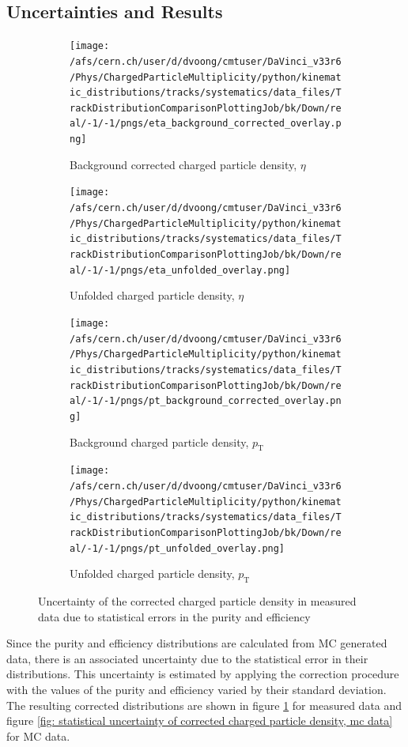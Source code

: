 \subsection{Uncertainties and Results}
\label{subsection: charged particle density, systematics}

\begin{figure}[h]
	\begin{subfigure}{0.49\textwidth}
		\texttt{[image: /afs/cern.ch/user/d/dvoong/cmtuser/DaVinci\_v33r6/Phys/ChargedParticleMultiplicity/python/kinematic\_distributions/tracks/systematics/data\_files/TrackDistributionComparisonPlottingJob/bk/Down/real/-1/-1/pngs/eta\_background\_corrected\_overlay.png]}
		\caption{Background corrected charged particle density, $\eta$}
	\end{subfigure}
	\begin{subfigure}{0.49\textwidth}
		\texttt{[image: /afs/cern.ch/user/d/dvoong/cmtuser/DaVinci\_v33r6/Phys/ChargedParticleMultiplicity/python/kinematic\_distributions/tracks/systematics/data\_files/TrackDistributionComparisonPlottingJob/bk/Down/real/-1/-1/pngs/eta\_unfolded\_overlay.png]}
		\caption{Unfolded charged particle density, $\eta$}
	\end{subfigure}
	\begin{subfigure}{0.49\textwidth}
		\texttt{[image: /afs/cern.ch/user/d/dvoong/cmtuser/DaVinci\_v33r6/Phys/ChargedParticleMultiplicity/python/kinematic\_distributions/tracks/systematics/data\_files/TrackDistributionComparisonPlottingJob/bk/Down/real/-1/-1/pngs/pt\_background\_corrected\_overlay.png]}
		\caption{Background  charged particle density, $p_\mathrm{T}$}
	\end{subfigure}
	\begin{subfigure}{0.49\textwidth}
		\texttt{[image: /afs/cern.ch/user/d/dvoong/cmtuser/DaVinci\_v33r6/Phys/ChargedParticleMultiplicity/python/kinematic\_distributions/tracks/systematics/data\_files/TrackDistributionComparisonPlottingJob/bk/Down/real/-1/-1/pngs/pt\_unfolded\_overlay.png]}
		\caption{Unfolded charged particle density, $p_\mathrm{T}$}
	\end{subfigure}
	\caption{Uncertainty of the corrected charged particle density in measured data due to statistical errors in the purity and efficiency}
	\label{fig: statistical uncertainty of corrected charged particle density, measured data}
\end{figure}

Since the purity and efficiency distributions are calculated from MC generated data, there is an associated uncertainty due to the statistical error in their distributions. This uncertainty is estimated by applying the correction procedure with the values of the purity and efficiency varied by their standard deviation. The resulting corrected distributions are shown in figure \ref{fig: statistical uncertainty of corrected charged particle density, measured data} for measured data and figure \ref{fig: statistical uncertainty of corrected charged particle density, mc data} for MC data.

